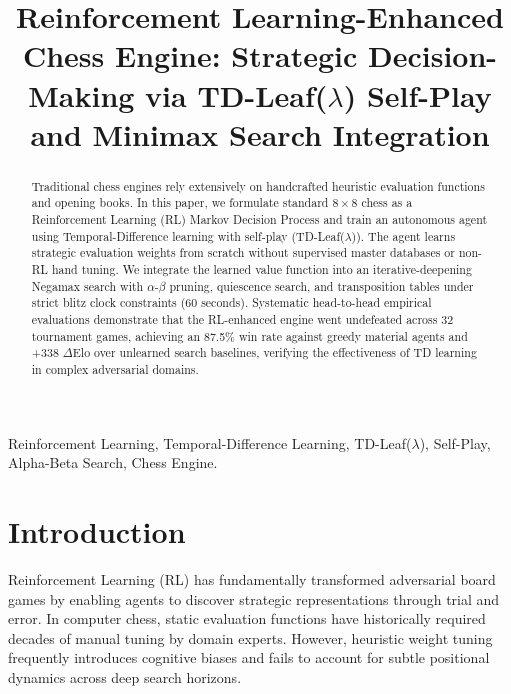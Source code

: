 \documentclass[conference,10pt,twocolumn]{IEEEtran}
\begin{document}
\title{Reinforcement Learning-Enhanced Chess Engine: Strategic Decision-Making via TD-Leaf($\lambda$) Self-Play and Minimax Search Integration}

\author{
}

\maketitle

\begin{abstract}
Traditional chess engines rely extensively on handcrafted heuristic evaluation functions and opening books. In this paper, we formulate standard $8\times 8$ chess as a Reinforcement Learning (RL) Markov Decision Process and train an autonomous agent using Temporal-Difference learning with self-play (TD-Leaf($\lambda$)). The agent learns strategic evaluation weights from scratch without supervised master databases or non-RL hand tuning. We integrate the learned value function into an iterative-deepening Negamax search with $\alpha$-$\beta$ pruning, quiescence search, and transposition tables under strict blitz clock constraints (60 seconds). Systematic head-to-head empirical evaluations demonstrate that the RL-enhanced engine went undefeated across 32 tournament games, achieving an 87.5\% win rate against greedy material agents and +338 $\Delta$Elo over unlearned search baselines, verifying the effectiveness of TD learning in complex adversarial domains.
\end{abstract}

\begin{IEEEkeywords}
Reinforcement Learning, Temporal-Difference Learning, TD-Leaf($\lambda$), Self-Play, Alpha-Beta Search, Chess Engine.
\end{IEEEkeywords}

\section{Introduction}
Reinforcement Learning (RL) has fundamentally transformed adversarial board games by enabling agents to discover strategic representations through trial and error. In computer chess, static evaluation functions have historically required decades of manual tuning by domain experts. However, heuristic weight tuning frequently introduces cognitive biases and fails to account for subtle positional dynamics across deep search horizons.
\end{document}
